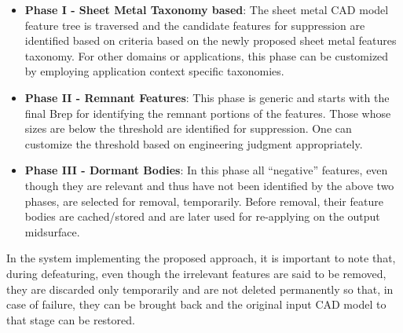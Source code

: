 	\begin{itemize}
	[noitemsep,topsep=2pt,parsep=2pt,partopsep=2pt,leftmargin=*]
	\item \textbf{Phase I - Sheet Metal Taxonomy based}: The sheet metal CAD model feature tree is traversed and the candidate features for suppression are identified based on criteria based on the newly proposed sheet metal features taxonomy. For other domains or applications, this phase can be customized by employing application context specific taxonomies.
	
	\item \textbf{Phase II - Remnant Features}: This phase is generic and starts with the final Brep for identifying the remnant portions of the features. Those whose sizes are below the threshold are identified for suppression. One can customize the threshold based on engineering judgment appropriately.
	
	\item \textbf{Phase III - Dormant Bodies}: In this phase all ``negative'' features, even though they are relevant and thus have not been identified by the above two phases, are selected for removal, temporarily. Before removal, their feature bodies are cached/stored and are later used for re-applying on the output midsurface. 
	\end{itemize}
	

In the system implementing the proposed approach, it is important to note that, during defeaturing, even though the irrelevant features are said to be removed, they are discarded only temporarily and are not deleted permanently so that, in case of failure, they can be brought back and the original input CAD model to that stage can be restored.
 
